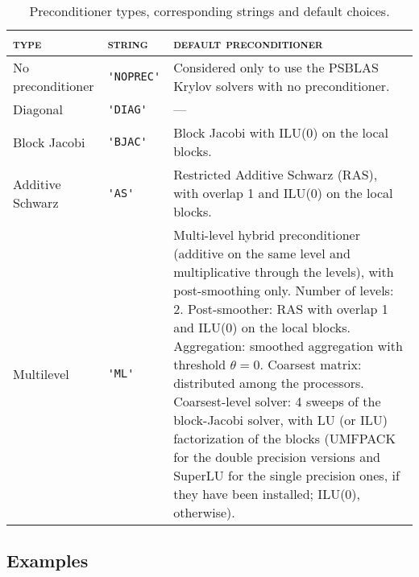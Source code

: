 \begin{table}[th]
\begin{center}
\begin{tabular}{|l|l|p{6.4cm}|}
\hline
\textsc{type}       & \textsc{string} & \textsc{default preconditioner} \\ \hline
No preconditioner &\verb|'NOPREC'|& Considered only to use the PSBLAS
                                    Krylov solvers with no preconditioner. \\ \hline
Diagonal          & \verb|'DIAG'| & --- \\ \hline
Block Jacobi      & \verb|'BJAC'| & Block Jacobi with ILU(0) on the local blocks.\\ \hline
Additive Schwarz  & \verb|'AS'|   & Restricted Additive Schwarz (RAS),
                                    with overlap 1 and ILU(0) on the local blocks. \\ \hline
Multilevel        &\verb|'ML'|    & Multi-level hybrid preconditioner (additive on the
                                    same level and multiplicative through the levels),
                                    with post-smoothing only.
                                    Number of levels: 2.
	                                  Post-smoother: RAS with overlap 1 and ILU(0)
                                    on the local blocks.
                                    Aggregation: smoothed aggregation with
                                    threshold $\theta = 0$.
                                    Coarsest matrix: distributed among the processors.
                                    Coarsest-level solver: 
                                    4 sweeps of the block-Jacobi solver, 
                                    with LU (or ILU) factorization of the blocks
                                    (UMFPACK for the double precision versions and
                                    SuperLU for the single precision ones, if they have been
                                    installed; ILU(0), otherwise).         \\
\hline
\end{tabular}
\end{center}

\caption{Preconditioner types, corresponding strings and default choices.
\label{tab:precinit}}
\end{table}

\subsection{Examples\label{sec:examples}}

